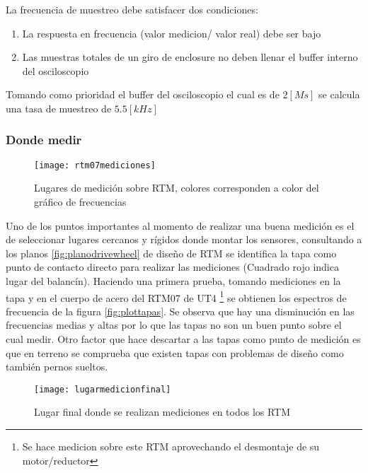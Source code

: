 	            La frecuencia de muestreo debe satisfacer dos condiciones:
	            \begin{enumerate}
	                \item La respuesta en  frecuencia (valor medicion/ valor real) debe ser bajo
	                \item Las muestras totales de un giro de enclosure no deben llenar el buffer interno del osciloscopio
	            \end{enumerate}
	            Tomando como prioridad el buffer del osciloscopio el cual es de $2[Ms]$ se calcula una tasa de muestreo de $5.5[kHz]$
	            
	            
	        \subsubsection{Donde medir}
	            \begin{figure}[H]
	                \centering
	                \texttt{[image: rtm07mediciones]}
	                \caption{Lugares de medición sobre RTM, colores corresponden a color del gráfico de frecuencias}
	                \label{fig:rtm07dondemidio}
	            \end{figure}
	            Uno de los puntos importantes al momento de realizar una buena medición es el de seleccionar lugares cercanos y rígidos donde montar los sensores, consultando a los planos \ref{fig:planodrivewheel} de diseño de RTM se identifica la tapa como punto de contacto directo para realizar las mediciones (Cuadrado rojo indica lugar del balancín). Haciendo una primera prueba, tomando mediciones en la tapa y en el cuerpo de acero del RTM07 de UT4 \footnote{Se hace medicion sobre este RTM aprovechando el desmontaje de su motor/reductor} se obtienen los espectros de frecuencia de la figura \ref{fig:plottapas}. Se observa que hay una disminución en las frecuencias medias y altas por lo que las tapas no son un buen punto sobre el cual medir. Otro factor que hace descartar a las tapas como punto de medición es que en terreno se comprueba que existen tapas con problemas de diseño como también pernos sueltos.
	            \begin{figure}[H]
	                \centering
	                \texttt{[image: lugarmedicionfinal]}
	                \caption{Lugar final donde se realizan mediciones en todos los RTM}
	                \label{fig:lugaresdemedicionfinal}
	            \end{figure}
	            
